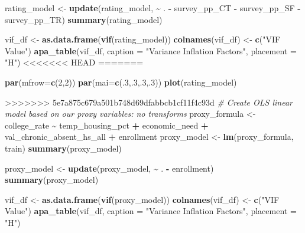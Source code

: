 \documentclass[
  man,floatsintext]{apa6}
\newenvironment{Shaded}{\begin{snugshade}}{\end{snugshade}}
\newcommand{\AttributeTok}[1]{\textcolor[rgb]{0.13,0.29,0.53}{#1}}
\newcommand{\CommentTok}[1]{\textcolor[rgb]{0.56,0.35,0.01}{\textit{#1}}}
\newcommand{\DecValTok}[1]{\textcolor[rgb]{0.00,0.00,0.81}{#1}}
\newcommand{\FunctionTok}[1]{\textcolor[rgb]{0.13,0.29,0.53}{\textbf{#1}}}
\newcommand{\NormalTok}[1]{#1}
\newcommand{\OtherTok}[1]{\textcolor[rgb]{0.56,0.35,0.01}{#1}}
\newcommand{\SpecialCharTok}[1]{\textcolor[rgb]{0.81,0.36,0.00}{\textbf{#1}}}
\newcommand{\StringTok}[1]{\textcolor[rgb]{0.31,0.60,0.02}{#1}}
\begin{document}
\begin{Shaded}
\begin{Highlighting}[]
\NormalTok{rating\_model }\OtherTok{\textless{}{-}} \FunctionTok{update}\NormalTok{(rating\_model, }\SpecialCharTok{\textasciitilde{}}\NormalTok{ . }\SpecialCharTok{{-}}\NormalTok{ survey\_pp\_CT }\SpecialCharTok{{-}}\NormalTok{ survey\_pp\_SF }\SpecialCharTok{{-}}\NormalTok{ survey\_pp\_TR)}
\FunctionTok{summary}\NormalTok{(rating\_model)}

\NormalTok{vif\_df }\OtherTok{\textless{}{-}} \FunctionTok{as.data.frame}\NormalTok{(}\FunctionTok{vif}\NormalTok{(rating\_model))}
\FunctionTok{colnames}\NormalTok{(vif\_df) }\OtherTok{\textless{}{-}} \FunctionTok{c}\NormalTok{(}\StringTok{"VIF Value"}\NormalTok{)}
\FunctionTok{apa\_table}\NormalTok{(vif\_df, }\AttributeTok{caption =} \StringTok{"Variance Inflation Factors"}\NormalTok{, }\AttributeTok{placement =} \StringTok{"H"}\NormalTok{)}
<<<<<<< HEAD
=======

\FunctionTok{par}\NormalTok{(}\AttributeTok{mfrow=}\FunctionTok{c}\NormalTok{(}\DecValTok{2}\NormalTok{,}\DecValTok{2}\NormalTok{))}
\FunctionTok{par}\NormalTok{(}\AttributeTok{mai=}\FunctionTok{c}\NormalTok{(.}\DecValTok{3}\NormalTok{,.}\DecValTok{3}\NormalTok{,.}\DecValTok{3}\NormalTok{,.}\DecValTok{3}\NormalTok{))}
\FunctionTok{plot}\NormalTok{(rating\_model)}

>>>>>>> 5e7a875c679a501b748d69dfabbcb1cf11f4c93d
\CommentTok{\# Create OLS linear model based on our proxy variables: no transforms}
\NormalTok{proxy\_formula }\OtherTok{\textless{}{-}}\NormalTok{ college\_rate }\SpecialCharTok{\textasciitilde{}}\NormalTok{ temp\_housing\_pct }\SpecialCharTok{+}\NormalTok{ economic\_need }\SpecialCharTok{+}\NormalTok{ val\_chronic\_absent\_hs\_all }\SpecialCharTok{+}\NormalTok{ enrollment}
\NormalTok{proxy\_model }\OtherTok{\textless{}{-}} \FunctionTok{lm}\NormalTok{(proxy\_formula, train)}
\FunctionTok{summary}\NormalTok{(proxy\_model)}

\NormalTok{proxy\_model }\OtherTok{\textless{}{-}} \FunctionTok{update}\NormalTok{(proxy\_model, }\SpecialCharTok{\textasciitilde{}}\NormalTok{ . }\SpecialCharTok{{-}}\NormalTok{ enrollment)}
\FunctionTok{summary}\NormalTok{(proxy\_model)}

\NormalTok{vif\_df }\OtherTok{\textless{}{-}} \FunctionTok{as.data.frame}\NormalTok{(}\FunctionTok{vif}\NormalTok{(proxy\_model))}
\FunctionTok{colnames}\NormalTok{(vif\_df) }\OtherTok{\textless{}{-}} \FunctionTok{c}\NormalTok{(}\StringTok{"VIF Value"}\NormalTok{)}
\FunctionTok{apa\_table}\NormalTok{(vif\_df, }\AttributeTok{caption =} \StringTok{"Variance Inflation Factors"}\NormalTok{, }\AttributeTok{placement =} \StringTok{"H"}\NormalTok{)}


\end{Highlighting}
\end{Shaded}
\end{document}
